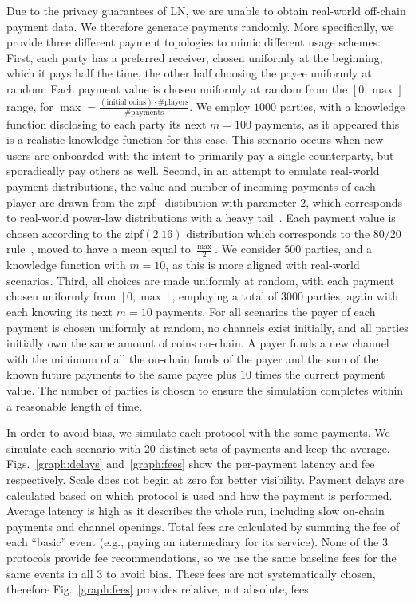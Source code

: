   Due to the privacy guarantees of LN, we are unable to obtain real-world
  off-chain payment data. We therefore generate payments randomly. More
  specifically, we provide three different payment topologies to mimic
  different usage schemes: First, each party has a preferred receiver, chosen
  uniformly at the beginning, which it pays half the time, the other half
  choosing the payee uniformly at random. Each payment value is chosen
  uniformly at random from the $[0, \max]$ range, for $\max =
  \frac{(\text{initial coins}) \cdot \text{\#players}}{\text{\#payments}}$. We
  employ $1000$ parties, with a knowledge function disclosing to each party its
  next $m=100$ payments, as it appeared this is a realistic knowledge function
  for this case. This scenario occurs when new users are onboarded with
  the intent to primarily pay a single counterparty, but sporadically pay
  others as well. Second, in an attempt to emulate real-world payment
  distributions, the value and number of incoming payments of each player are
  drawn from the zipf~\cite{powers-1998-applications} distibution with
  parameter $2$, which corresponds to real-world power-law distributions with a
  heavy tail~\cite{DBLP:journals/cn/BroderKMRRSTW00}. Each payment value is
  chosen according to the
  zipf$(2.16)$ distribution which corresponds to the $80/20$
  rule~\cite{pareto}, moved to have a mean equal to $\frac{\max}{2}$. We
  consider $500$ parties, and a knowledge function with $m=10$, as this is more
  aligned with real-world scenarios. Third, all choices are made uniformly at
  random, with each payment chosen uniformly from $[0, \max]$, employing a
  total of $3000$ parties, again with each knowing its next $m=10$ payments.
  For all scenarios the payer of each payment is chosen uniformly at
  random, no channels exist initially, and all parties initially own the same
  amount of coins on-chain. A payer funds a new channel with the minimum of all
  the on-chain funds of the payer and the sum of the known future payments to
  the same payee plus $10$ times the current payment value. The
  number of parties is chosen to ensure the simulation completes within a
  reasonable length of time.

  In order to avoid bias, we simulate each
  protocol with the same payments. We simulate each scenario with $20$
  distinct sets of payments and keep the average. Figs.~\ref{graph:delays}
  and~\ref{graph:fees} show the per-payment latency and fee
  respectively. Scale does not begin at zero for better visibility. Payment
  delays are calculated based on which protocol is used and how the payment is
  performed. Average
  latency is high as it describes the whole run, including slow on-chain
  payments and channel openings. Total fees are calculated by summing the fee
  of each ``basic'' event (e.g., paying an intermediary for its service). None
  of the $3$ protocols provide fee recommendations, so we use the same baseline
  fees for the same events in all $3$ to avoid bias. These
  fees are not systematically chosen, therefore Fig.~\ref{graph:fees} provides
  relative, not absolute, fees.

